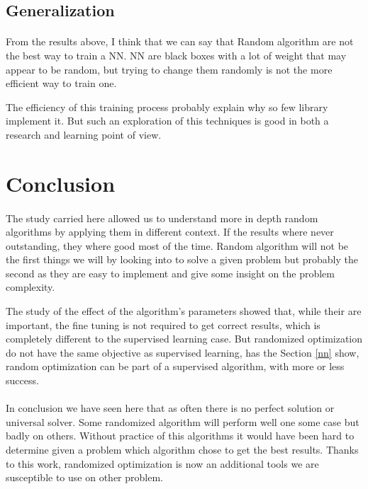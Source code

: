 \documentclass[twocolumn,a4paper,10pt]{article}
\begin{document}
\subsection{Generalization}
\paragraph{}
From the results above, I think that we can say that Random algorithm are not the best way to train a NN. NN are black boxes with a lot of weight that may appear to be random, but trying to change them randomly is not the more efficient way to train one.

The efficiency of this training process probably explain why so few library implement it. But such an exploration of this techniques is good in both a research and learning point of view.

\section{Conclusion}
\paragraph{}
The study carried here allowed us to understand more in depth random algorithms by applying them in different context. If the results where never outstanding, they where good most of the time. Random algorithm will not be the first things we will by looking into to solve a given problem but probably the second as they are easy to implement and give some insight on the problem complexity.

The study of the effect of the algorithm's parameters showed that, while their are important, the fine tuning is not required to get correct results, which is completely different to the supervised learning case. But randomized optimization do not have the same objective as supervised learning, has the Section \ref{nn} show, random optimization can be part of a supervised algorithm, with more or less success.

\paragraph{}
In conclusion we have seen here that as often there is no perfect solution or universal solver. Some randomized algorithm will perform well one some case but badly on others. Without practice of this algorithms it would have been hard to determine given a problem which algorithm chose to get the best results. Thanks to this work, randomized optimization is now an additional tools we are susceptible to use on other problem.
\end{document}
